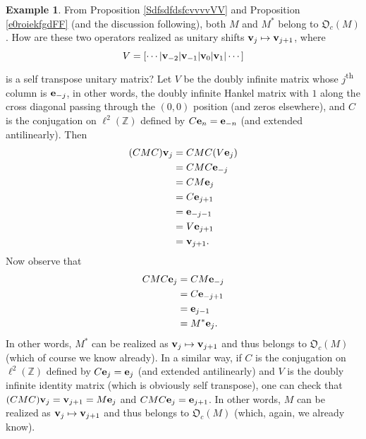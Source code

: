 \documentclass{dis}
\theoremstyle{plain}
\theoremstyle{definition}
\newtheorem{Example}[equation]{Example}
\def\Z{\mathbb{Z}}
\renewcommand{\vec}[1]{{\bf #1}}
\newcommand{\0}{{\color{lightgray}0}}
\begin{document}
\begin{Example}
From Proposition \ref{SdfsdfdsfcvvvvVV} and Proposition \ref{e0roiekfgdFF} (and the discussion following), both $M$ and $M^{*}$ belong to $\mathfrak{O}_c(M)$. How are these two operators realized as unitary shifts $\vec{v}_{j} \mapsto \vec{v}_{j + 1}$, where $$V =  [\cdots|\vec{v}_{-2} |\vec{v}_{-1} |\vec{v}_0 | \vec{v}_1| \cdots]$$ is a self transpose unitary matrix? Let $V$ be the doubly infinite matrix whose $j$\textsuperscript{th} column is $\vec{e}_{-j}$, in other words, the doubly infinite Hankel matrix with $1$ along the cross diagonal passing through the $(0, 0)$ position (and zeros elsewhere), and $C$ is the conjugation on $\ell^2(\Z)$ defined by $C \vec{e}_n = \vec{e}_{-n}$ (and extended antilinearly). Then
\begin{align*}
(C M C) \vec{v}_{j} & =  CMC(V \vec{e}_j)\\
& = C M C \vec{e}_{-j}\\
& = C M \vec{e}_{j}\\
& = C \vec{e}_{j + 1}\\
& = \vec{e}_{-j - 1}\\
& = V \vec{e}_{j + 1}\\
& = \vec{v}_{j + 1}.
\end{align*}
Now observe that 
\begin{align*}
C M C \vec{e}_{j} & = C M \vec{e}_{-j}\\
& = C  \vec{e}_{-j + 1}\\
& = \vec{e}_{j - 1}\\
& = M^{*} \vec{e}_{j}.
\end{align*}
In other words, $M^{*}$ can be realized as $\vec{v}_{j} \mapsto \vec{v}_{j + 1}$ and thus belongs to $\mathfrak{O}_c(M)$ (which of course we know already). In a similar way, if $C$ is the conjugation on $\ell^2(\Z)$ defined by $C \vec{e}_{j} = \vec{e}_{j}$ (and extended antilinearly) and $V$ is the doubly infinite identity matrix (which is obviously self transpose), one can check that $(C M C) \vec{v}_{j} = \vec{v}_{j + 1} = M \vec{e}_j$ and $C M C \vec{e}_{j} = \vec{e}_{j + 1}$. In other words, $M$ can be realized as $\vec{v}_{j} \mapsto \vec{v}_{j + 1}$ and thus belongs to $\mathfrak{O}_c(M)$ (which, again, we already know). 
\end{Example}
\end{document}
